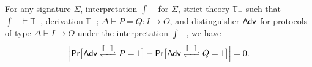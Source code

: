 
\begin{lemma}\label{lem:soundness_approximate_perfect}
For any \ipdl signature $\Sigma$, interpretation $\int{-}$ for $\Sigma$, strict \ipdl theory $\mathbb{T}_=$ such that $\int{-} \vDash \mathbb{T}_=$, derivation $\mathbb{T}_=; \, \Delta \vdash P = Q : I \to O$, and distinguisher $\mathsf{Adv}$ for protocols of type $\Delta \vdash I \to O$ under the interpretation $\int{-}$, we have
\[\Big|\mathsf{Pr}\big[\interaction{\Adv}{P}{\int{-}} = 1\big] - \mathsf{Pr}\big[\interaction{\Adv}{Q}{\int{-}} = 1\big]\Big| = 0.\]
\end{lemma}

